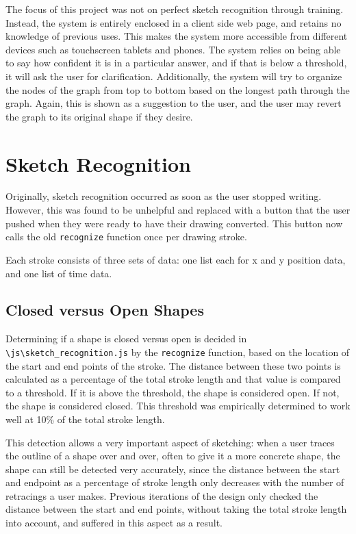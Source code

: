 \documentclass[12pt]{article}
\begin{document}
\par The focus of this project was not on perfect sketch recognition through training. Instead, the system is entirely enclosed in a client side web page, and retains no knowledge of previous uses. This makes the system more accessible from different devices such as touchscreen tablets and phones. The system relies on being able to say how confident it is in a particular answer, and if that is below a threshold, it will ask the user for clarification. Additionally, the system will try to organize the nodes of the graph from top to bottom based on the longest path through the graph. Again, this is shown as a suggestion to the user, and the user may revert the graph to its original shape if they desire.

\section{Sketch Recognition}
Originally, sketch recognition occurred as soon as the user stopped writing. However, this was found to be unhelpful and replaced with a button that the user pushed when they were ready to have their drawing converted. This button now calls the old \texttt{recognize} function once per drawing stroke.\\

\par Each stroke consists of three sets of data: one list each for x and y position data, and one list of time data.

\subsection{Closed versus Open Shapes}

\par Determining if a shape is closed versus open is decided in \texttt{\\\textbackslash js\textbackslash sketch\_recognition.js} by the \texttt{recognize} function, based on the location of the start and end points of the stroke. The distance between these two points is calculated as a percentage of the total stroke length and that value is compared to a threshold. If it is above the threshold, the shape is considered open. If not, the shape is considered closed. This threshold was empirically determined to work well at 10\% of the total stroke length.\\

\par This detection allows a very important aspect of sketching: when a user traces the outline of a shape over and over, often to give it a more concrete shape, the shape can still be detected very accurately, since the distance between the start and endpoint as a percentage of stroke length only decreases with the number of retracings a user makes. Previous iterations of the design only checked the distance between the start and end points, without taking the total stroke length into account, and suffered in this aspect as a result.
\end{document}
